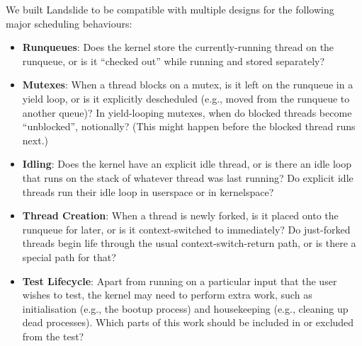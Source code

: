 
We built Landslide to be compatible with multiple designs for the following major scheduling behaviours:

\begin{itemize}
	\item {\bf Runqueues}: Does the kernel store the currently-running thread on the runqueue, or is it ``checked out'' while running and stored separately?
	\item {\bf Mutexes}: When a thread blocks on a mutex, is it left on the runqueue in a yield loop, or is it explicitly descheduled (e.g., moved from the runqueue to another queue)? In yield-looping mutexes, when do blocked threads become ``unblocked'', notionally? (This might happen before the blocked thread runs next.)
	\item {\bf Idling}: Does the kernel have an explicit idle thread, or is there an idle loop that runs on the stack of whatever thread was last running? Do explicit idle threads run their idle loop in userspace or in kernelspace?
	\item {\bf Thread Creation}: When a thread is newly forked, is it placed onto the runqueue for later, or is it context-switched to immediately? Do just-forked threads begin life through the usual context-switch-return path, or is there a special path for that?
	\item {\bf Test Lifecycle}: Apart from running on a particular input that the user wishes to test, the kernel may need to perform extra work, such as initialisation (e.g., the bootup process) and housekeeping (e.g., cleaning up dead processes).
	Which parts of this work should be included in or excluded from the test?
\end{itemize}
